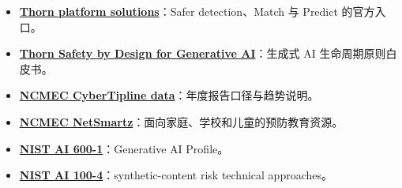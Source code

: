 {\small
\begin{itemize}[nosep,leftmargin=*]
  \item \href{https://www.thorn.org/solutions/for-platforms/}{\textbf{Thorn platform solutions}}：Safer detection、Match 与 Predict 的官方入口。
  \item \href{https://info.thorn.org/hubfs/thorn-safety-by-design-for-generative-AI.pdf}{\textbf{Thorn Safety by Design for Generative AI}}：生成式 AI 生命周期原则白皮书。
  \item \href{https://www.missingkids.org/gethelpnow/cybertipline/cybertiplinedata}{\textbf{NCMEC CyberTipline data}}：年度报告口径与趋势说明。
  \item \href{https://www.missingkids.org/netsmartz/home}{\textbf{NCMEC NetSmartz}}：面向家庭、学校和儿童的预防教育资源。
  \item \href{https://nvlpubs.nist.gov/nistpubs/ai/NIST.AI.600-1.pdf}{\textbf{NIST AI 600-1}}：Generative AI Profile。
  \item \href{https://nvlpubs.nist.gov/nistpubs/ai/NIST.AI.100-4.pdf}{\textbf{NIST AI 100-4}}：synthetic-content risk technical approaches。
\end{itemize}
}


